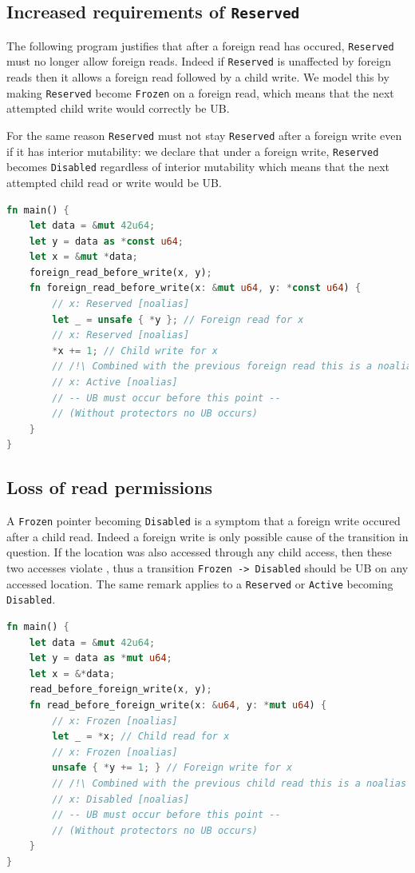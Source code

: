 \documentclass[a4paper,11pt]{article}
\theoremstyle{plain}
\theoremstyle{definition}
\theoremstyle{remark}
\newcommand{\tcode}[1]{\rstinline{#1}}
\newcommand{\tperm}[1]{\texttt{#1}}
\begin{document}
\subsection{Increased requirements of \tperm{Reserved}}

The following program justifies that after a foreign read has occured, \tperm{Reserved} must no longer allow
foreign reads. Indeed if \tperm{Reserved} is unaffected by foreign reads then it allows a foreign read
followed by a child write. We model this by making \tperm{Reserved} become \tperm{Frozen} on a foreign read,
which means that the next attempted child write would correctly be UB.

For the same reason \tperm{Reserved} must not stay \tperm{Reserved} after a foreign write even
if it has interior mutability: we declare that under a foreign write, \tperm{Reserved} becomes
\tperm{Disabled} regardless of interior mutability which means that the next attempted child read or write would be UB.

\begin{lstlisting}[language=rust]
fn main() {
    let data = &mut 42u64;
    let y = data as *const u64;
    let x = &mut *data;
    foreign_read_before_write(x, y);
    fn foreign_read_before_write(x: &mut u64, y: *const u64) {
        // x: Reserved [noalias]
        let _ = unsafe { *y }; // Foreign read for x
        // x: Reserved [noalias]
        *x += 1; // Child write for x
        // /!\ Combined with the previous foreign read this is a noalias violation
        // x: Active [noalias]
        // -- UB must occur before this point --
        // (Without protectors no UB occurs)
    }
}
\end{lstlisting}


\subsection{Loss of read permissions}

A \tperm{Frozen} pointer becoming \tperm{Disabled} is a symptom that a foreign write occured after
a child read. Indeed a foreign write is only possible cause of the transition in question.
If the location was also accessed through any child access, then these two accesses violate
\tcode{noalias}, thus a transition \tperm{Frozen -> Disabled} should be UB on any accessed location.
The same remark applies to a \tperm{Reserved} or \tperm{Active} becoming \tperm{Disabled}.

\begin{lstlisting}[language=rust]
fn main() {
    let data = &mut 42u64;
    let y = data as *mut u64;
    let x = &*data;
    read_before_foreign_write(x, y);
    fn read_before_foreign_write(x: &u64, y: *mut u64) {
        // x: Frozen [noalias]
        let _ = *x; // Child read for x
        // x: Frozen [noalias]
        unsafe { *y += 1; } // Foreign write for x
        // /!\ Combined with the previous child read this is a noalias violation
        // x: Disabled [noalias]
        // -- UB must occur before this point --
        // (Without protectors no UB occurs)
    }
}
\end{lstlisting}
\end{document}
